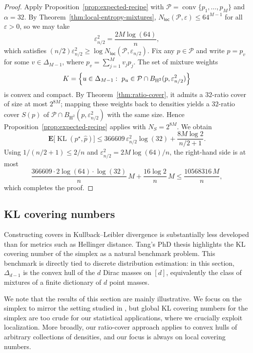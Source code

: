 \documentclass[11pt]{article}
\newcommand{\E}{{\mathbf E}}
\renewcommand{\le}{\leqslant}
\renewcommand{\ge}{\geqslant}
\newcommand{\eps}{\varepsilon}
\newcommand{\M}{M}
\newcommand{\nloc}{N_{\mathsf{loc}}}
\newcommand{\conv}{\mathop{\mathrm{conv}}}
\newcommand{\kl}{\operatorname{KL}}
\newcommand{\hel}{\operatorname{H}}
\newcommand{\hels}{\hel^2}
\theoremstyle{definition}
\theoremstyle{remark}
\begin{document}
\begin{proof}
Apply Proposition~\ref{prop:expected-recipe} with $\mathcal{P}=\conv\{p_1,\ldots,p_\M\}$ and $\alpha=32$.
By Theorem~\ref{thm:local-entropy-mixtures}, $\nloc(\mathcal{P},\eps)\le 64^{\M-1}$ for all $\eps>0$, so we may take
\[
\eps_{n/2}^2=\frac{2M\log(64)}{n},
\]
which satisfies $(n/2)\eps_{n/2}^2 \ge \log \nloc(\mathcal{P},\eps_{n/2})$. Fix any $p\in\mathcal{P}$ and write $p=p_v$ for some $v\in\Delta_{\M-1}$, where $p_v=\sum_{j=1}^M v_j p_j$.
The set of mixture weights
\[
K=\Bigl\{u\in\Delta_{\M-1}:\ p_u \in \mathcal{P}\cap B_{\hels}(p,\eps_{n/2}^2)\Bigr\}
\]
is convex and compact. By Theorem~\ref{thm:ratio-cover}, it admits a $32$-ratio cover of size at most $2^{8M}$; mapping these weights back to densities yields a $32$-ratio cover $S(p)$ of $\mathcal{P}\cap B_{\hels}(p,\eps_{n/2}^2)$ with the same size. Hence Proposition~\ref{prop:expected-recipe} applies with $N_S=2^{8M}$. We obtain
\[
\E\big[\kl(p^\star,\widehat{p})\big]
\le
366609\,\eps_{n/2}^2\log(32)+\frac{8M\log 2}{n/2+1}.
\]
Using $1/(n/2+1)\le 2/n$ and $\eps_{n/2}^2=2M\log(64)/n$, the right-hand side is at most
\[
\frac{366609\cdot 2\log(64)\cdot \log(32)}{n}\,M+\frac{16\log 2}{n}\,M
\le \frac{10568316\,M}{n},
\]
which completes the proof.\qedhere
\end{proof}


\subsection{KL covering numbers}\label{subsection:apply-kl-cover}

Constructing covers in Kullback--Leibler divergence is substantially less developed than for metrics such as Hellinger distance. 
Tang's PhD thesis \cite{tang2022divergence} highlights the KL covering number of the simplex as a natural benchmark problem. This benchmark is directly tied to discrete distribution estimation: in this section, $\Delta_{d-1}$ is the convex hull of the $d$ Dirac masses on $[d]$, equivalently the class of mixtures of a finite dictionary of $d$ point masses.

We note that the results of this section are mainly illustrative. We focus on the simplex to mirror the setting studied in \cite{tang2022divergence}, but global KL covering numbers for the simplex are too crude for our statistical applications, where we crucially exploit localization. More broadly, our ratio-cover approach applies to convex hulls of arbitrary collections of densities, and our focus is always on {local} covering numbers.
\end{document}
